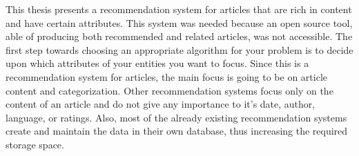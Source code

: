
This thesis presents a recommendation system for articles that are rich in content and have certain attributes. This system was needed because an open source tool, able of producing both recommended and related articles, was not accessible. The first step towards choosing an appropriate algorithm for your problem is to decide upon which attributes of your entities you want to focus. Since this is a recommendation system for articles, the main focus is going to be on article content and categorization. Other recommendation systems focus only on the content of an article and do not give any importance to it's date, author, language, or ratings. Also, most of the already existing recommendation systems create and maintain the data in their own database, thus increasing the required storage space.